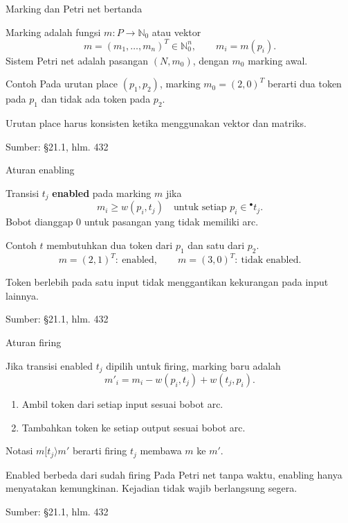 \documentclass[aspectratio=169,11pt]{beamer}
\newcommand{\source}[1]{%
    \vfill
    \hfill{\tiny\color{gray}Sumber: #1}
}
\newcommand{\N}{\mathbb N}
\begin{document}
\begin{frame}{Marking dan Petri net bertanda}

Marking adalah fungsi $m:P\to\N_0$ atau vektor
\[
m=(m_1,\ldots,m_n)^T\in\N_0^n,\qquad m_i=m(p_i).
\]
Sistem Petri net adalah pasangan $(N,m_0)$, dengan $m_0$ marking awal.
\begin{exampleblock}{Contoh}
Pada urutan place $(p_1,p_2)$, marking $m_0=(2,0)^T$
berarti dua token pada $p_1$ dan tidak ada token pada $p_2$.
\end{exampleblock}
Urutan place harus konsisten ketika menggunakan vektor dan matriks.

\source{\S21.1, hlm. 432}
\end{frame}
\begin{frame}{Aturan enabling}

Transisi $t_j$ \textbf{enabled} pada marking $m$ jika
\[
m_i\ge w(p_i,t_j)\quad\text{untuk setiap }p_i\in{}^\bullet t_j.
\]
Bobot dianggap $0$ untuk pasangan yang tidak memiliki arc.
\begin{exampleblock}{Contoh}
$t$ membutuhkan dua token dari $p_1$ dan satu dari $p_2$.
\[
m=(2,1)^T:\ \text{enabled},\qquad
m=(3,0)^T:\ \text{tidak enabled}.
\]
\end{exampleblock}
Token berlebih pada satu input tidak menggantikan kekurangan pada input lainnya.

\source{\S21.1, hlm. 432}
\end{frame}
\begin{frame}{Aturan firing}

Jika transisi enabled $t_j$ dipilih untuk firing, marking baru adalah
\[
m'_i=m_i-w(p_i,t_j)+w(t_j,p_i).
\]
\begin{enumerate}
\item Ambil token dari setiap input sesuai bobot arc.
\item Tambahkan token ke setiap output sesuai bobot arc.
\end{enumerate}
Notasi $m[t_j\rangle m'$ berarti firing $t_j$ membawa $m$ ke $m'$.
\begin{block}{Enabled berbeda dari sudah firing}
Pada Petri net tanpa waktu, enabling hanya menyatakan kemungkinan.
Kejadian tidak wajib berlangsung segera.
\end{block}

\source{\S21.1, hlm. 432}
\end{frame}
\end{document}
